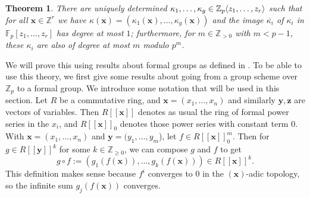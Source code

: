 \documentclass[12pt]{article}
\newcommand{\Z}{\mathbb{Z}}
\newcommand{\vx}{\mathbf{x}}
\newcommand{\vy}{\mathbf{y}}
\newcommand{\vz}{\mathbf{z}}
\newcommand{\F}{\mathbb{F}}
\renewcommand{\angle}[1]{\hspace{-2pt}\left\langle #1 \right\rangle}
\theoremstyle{plain}
\newtheorem{thm}{Theorem}[section] %
\theoremstyle{definition}
\theoremstyle{remark}
\begin{document}
\begin{thm}
\label{thm:kappanice}
There are uniquely determined $\kappa_1,\dots,\kappa_g \in \Z_p\angle{z_1,\dots,z_r}$ such that for all $\vx \in \Z^r$ we have $\kappa(\vx) = (\kappa_1(\vx),\dots,\kappa_g(\vx))$ and the image $\overline{\kappa_i}$ of $\kappa_i$ in $\F_p[z_1,\dots,z_r]$ has degree at most $1$; furthermore, for $m \in \Z_{>0}$ with $m<p-1$, these $\kappa_i$ are also of degree at most $m$ modulo $p^m$.
\end{thm}

We will prove this using results about formal groups as defined in \cite{honda70}. To be able to use this theory, we first give some results about going from a group scheme over $\Z_p$ to a formal group.
We introduce some notation that will be used in this section. Let $R$ be a commutative ring, and $\vx = (x_1,\dots,x_n)$ and similarly $\vy,\vz$ are vectors of variables. Then $R[[\vx]]$ denotes as usual the ring of formal power series in the $x_i$, and $R[[\vx]]_0$ denotes those power series with constant term $0$. With $\vx = (x_1,\dots,x_n)$ and $\vy = (y_1,\dots,y_m$), let $f \in R[[\vx]]_0^m$. Then for $g \in R[[\vy]]^k$ for some $k\in\Z_{\geq 0}$, we can compose $g$ and $f$ to get \[g\circ f := (g_1(f(\vx)),\dots,g_k(f(\vx)))\in R[[\vx]]^k.\] This definition makes sense because $f^i$ converges to $0$ in the $(\vx)$-adic topology, so the infinite sum $g_j(f(\vx))$ converges.
\end{document}
